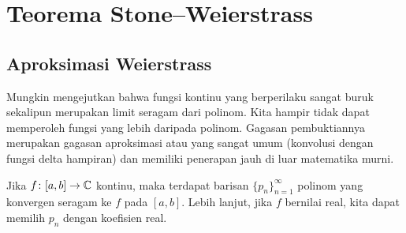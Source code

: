\sectionnewpage
\section{Teorema Stone--Weierstrass}
\label{sec:stoneweier}



\subsection{Aproksimasi Weierstrass}

Mungkin mengejutkan bahwa fungsi kontinu yang berperilaku sangat buruk sekalipun
merupakan limit seragam dari polinom.
Kita hampir tidak dapat memperoleh fungsi yang lebih 
daripada polinom.
Gagasan pembuktiannya merupakan gagasan aproksimasi atau 
yang sangat umum (konvolusi dengan fungsi delta hampiran) dan memiliki penerapan
jauh di luar matematika murni.

\begin{thm}
Jika $f \colon [a,b] \to {\mathbb{C}}$ kontinu, maka terdapat barisan
$\{ p_n \}_{n=1}^\infty$ polinom yang konvergen seragam ke $f$ pada $[a,b]$.
Lebih lanjut, jika $f$ bernilai real, kita dapat memilih $p_n$ dengan koefisien real.
\end{thm}

